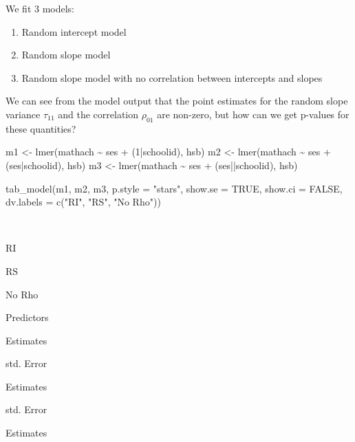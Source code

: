 \documentclass[
  letterpaper,
  DIV=11,
  numbers=noendperiod]{scrreprt}
\newenvironment{Shaded}{\begin{snugshade}}{\end{snugshade}}
\newcommand{\AttributeTok}[1]{\textcolor[rgb]{0.49,0.56,0.16}{#1}}
\newcommand{\ConstantTok}[1]{\textcolor[rgb]{0.53,0.00,0.00}{#1}}
\newcommand{\DecValTok}[1]{\textcolor[rgb]{0.25,0.63,0.44}{#1}}
\newcommand{\FunctionTok}[1]{\textcolor[rgb]{0.02,0.16,0.49}{#1}}
\newcommand{\NormalTok}[1]{\textcolor[rgb]{0.00,0.44,0.13}{#1}}
\newcommand{\OtherTok}[1]{\textcolor[rgb]{0.00,0.44,0.13}{#1}}
\newcommand{\SpecialCharTok}[1]{\textcolor[rgb]{0.25,0.44,0.63}{#1}}
\newcommand{\StringTok}[1]{\textcolor[rgb]{0.25,0.44,0.63}{#1}}
\providecommand{\tightlist}{%
  \setlength{\itemsep}{0pt}\setlength{\parskip}{0pt}}\usepackage{longtable,booktabs,array}
\begin{document}
We fit 3 models:

\begin{enumerate}
\def\labelenumi{\arabic{enumi}.}
\tightlist
\item
  Random intercept model
\item
  Random slope model
\item
  Random slope model with no correlation between intercepts and slopes
\end{enumerate}

We can see from the model output that the point estimates for the random
slope variance \(\tau_{11}\) and the correlation \(\rho_{01}\) are
non-zero, but how can we get p-values for these quantities?

\begin{Shaded}
\begin{Highlighting}[]
\NormalTok{m1 }\OtherTok{\textless{}{-}} \FunctionTok{lmer}\NormalTok{(mathach }\SpecialCharTok{\textasciitilde{}}\NormalTok{ ses }\SpecialCharTok{+}\NormalTok{ (}\DecValTok{1}\SpecialCharTok{|}\NormalTok{schoolid), hsb)}
\NormalTok{m2 }\OtherTok{\textless{}{-}} \FunctionTok{lmer}\NormalTok{(mathach }\SpecialCharTok{\textasciitilde{}}\NormalTok{ ses }\SpecialCharTok{+}\NormalTok{ (ses}\SpecialCharTok{|}\NormalTok{schoolid), hsb)}
\NormalTok{m3 }\OtherTok{\textless{}{-}} \FunctionTok{lmer}\NormalTok{(mathach }\SpecialCharTok{\textasciitilde{}}\NormalTok{ ses }\SpecialCharTok{+}\NormalTok{ (ses}\SpecialCharTok{||}\NormalTok{schoolid), hsb)}

\FunctionTok{tab\_model}\NormalTok{(m1, m2, m3,}
          \AttributeTok{p.style =} \StringTok{"stars"}\NormalTok{,}
          \AttributeTok{show.se =} \ConstantTok{TRUE}\NormalTok{,}
          \AttributeTok{show.ci =} \ConstantTok{FALSE}\NormalTok{,}
          \AttributeTok{dv.labels =} \FunctionTok{c}\NormalTok{(}\StringTok{"RI"}\NormalTok{, }\StringTok{"RS"}\NormalTok{, }\StringTok{"No Rho"}\NormalTok{))}
\end{Highlighting}
\end{Shaded}

~

RI

RS

No Rho

Predictors

Estimates

std. Error

Estimates

std. Error

Estimates
\end{document}
